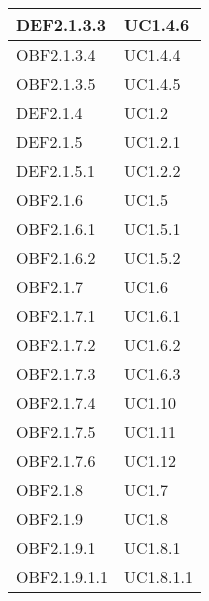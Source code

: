 \documentclass{scalatekids-article}
\begin{document}
\begin{longtable}[H]{|p{5.5cm}|p{5.5cm}|}
\hline
DEF2.1.3.3 & \multiLineCell[t]{UC1.4.6\\}\\
\hline
OBF2.1.3.4 & \multiLineCell[t]{UC1.4.4\\}\\
\hline
OBF2.1.3.5 & \multiLineCell[t]{UC1.4.5\\}\\
\hline
DEF2.1.4 & \multiLineCell[t]{UC1.2\\}\\
\hline
DEF2.1.5 & \multiLineCell[t]{UC1.2.1\\}\\
\hline
DEF2.1.5.1 & \multiLineCell[t]{UC1.2.2\\}\\
\hline
OBF2.1.6 & \multiLineCell[t]{UC1.5\\}\\
\hline
OBF2.1.6.1 & \multiLineCell[t]{UC1.5.1\\}\\
\hline
OBF2.1.6.2 & \multiLineCell[t]{UC1.5.2\\}\\
\hline
OBF2.1.7 & \multiLineCell[t]{UC1.6\\}\\
\hline
OBF2.1.7.1 & \multiLineCell[t]{UC1.6.1\\}\\
\hline
OBF2.1.7.2 & \multiLineCell[t]{UC1.6.2\\}\\
\hline
OBF2.1.7.3 & \multiLineCell[t]{UC1.6.3\\}\\
\hline
OBF2.1.7.4 & \multiLineCell[t]{UC1.10\\}\\
\hline
OBF2.1.7.5 & \multiLineCell[t]{UC1.11\\}\\
\hline
OBF2.1.7.6 & \multiLineCell[t]{UC1.12\\}\\
\hline
OBF2.1.8 & \multiLineCell[t]{UC1.7\\}\\
\hline
OBF2.1.9 & \multiLineCell[t]{UC1.8\\}\\
\hline
OBF2.1.9.1 & \multiLineCell[t]{UC1.8.1\\}\\
\hline
OBF2.1.9.1.1 & \multiLineCell[t]{UC1.8.1.1\\}\\
\hline

\end{longtable}
\end{document}
